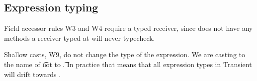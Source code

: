 \documentclass[a4paper,USenglish]{tex/lipics-v2016}
\begin{document}
\begin{mathpar}

\end{mathpar}

\subsection{Expression typing}

Field accessor rules W3 and W4 require a typed receiver, since \any does
not have any methods a receiver typed at \any will never typecheck.

Shallow casts, W9, do not change the type of the expression. We are casting
to the name of \t not to \t.  In practice that means that all expression
types in Transient will drift towards \any.

~\\
\end{document}
